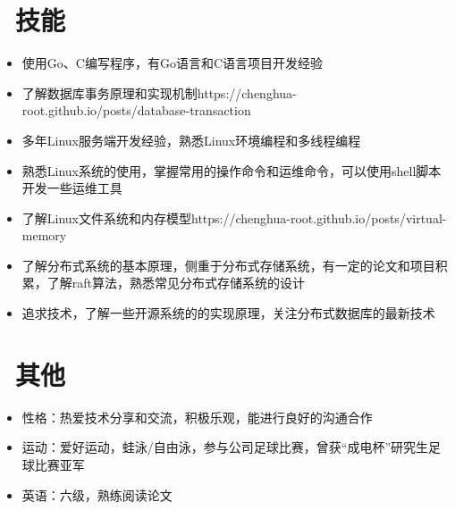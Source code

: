 \documentclass{resume}
\begin{document}
\section{\faCogs\  技能}
\begin{itemize}[parsep=0.5ex]
  \item 使用Go、C编写程序，有Go语言和C语言项目开发经验
  \item 了解数据库事务原理和实现机制https://chenghua-root.github.io/posts/database-transaction
  \item 多年Linux服务端开发经验，熟悉Linux环境编程和多线程编程
  \item 熟悉Linux系统的使用，掌握常用的操作命令和运维命令，可以使用shell脚本开发一些运维工具
  \item 了解Linux文件系统和内存模型https://chenghua-root.github.io/posts/virtual-memory
  \item 了解分布式系统的基本原理，侧重于分布式存储系统，有一定的论文和项目积累，了解raft算法，熟悉常见分布式存储系统的设计
  \item 追求技术，了解一些开源系统的的实现原理，关注分布式数据库的最新技术
\end{itemize}

\section{\faInfo\  其他}
\begin{itemize}[parsep=0.5ex]
  \item 性格：热爱技术分享和交流，积极乐观，能进行良好的沟通合作
  \item 运动：爱好运动，蛙泳/自由泳，参与公司足球比赛，曾获“成电杯”研究生足球比赛亚军
  \item 英语：六级，熟练阅读论文
\end{itemize}

%
%
\end{document}
